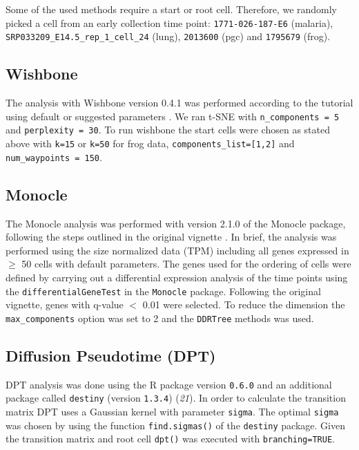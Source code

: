 Some of the used methods require a start or root cell. Therefore, we randomly picked a cell from an early collection time point: \texttt{1771-026-187-E6} (malaria), \texttt{SRP033209\_E14.5\_rep\_1\_cell\_24} (lung), \texttt{2013600} (pgc) and \texttt{1795679} (frog).

\subsection{Wishbone}

The analysis with Wishbone version 0.4.1 was performed according to the tutorial using default or suggested parameters \cite{Setty2016-ie}. We ran t-SNE with \texttt{n\_components = 5} and \texttt{perplexity = 30}. To run wishbone the start cells were chosen as  stated above with \texttt{k=15} or \texttt{k=50} for frog data, \texttt{components\_list=[1,2]} and \texttt{num\_waypoints = 150}.

\subsection{Monocle}

The Monocle analysis was performed with version 2.1.0 of the Monocle package, following the steps outlined in the original vignette \cite{Trapnell2014-cn}. In brief, the analysis was  performed using the size normalized data (TPM) including all genes expressed in $ \geq $ 50 cells with default parameters. The genes used for the ordering of cells were defined by carrying out a differential expression analysis of the time points using the \texttt{differentialGeneTest} in the \texttt{Monocle} package. Following the original vignette, genes with q-value $<$ 0.01 were selected. To reduce the dimension the \texttt{max\_components} option was set to 2 and the \texttt{DDRTree} methods was used.

\subsection{Diffusion Pseudotime (DPT)}

DPT analysis was done using the R package version \texttt{0.6.0} and an additional package called \texttt{destiny} (version \texttt{1.3.4}) ({\it 21}). In order to calculate the transition matrix DPT uses a Gaussian kernel with parameter \texttt{sigma}. The optimal \texttt{sigma} was chosen by  using the function \texttt{find.sigmas()} of the \texttt{destiny} package. Given the transition matrix and root cell \texttt{dpt()} was executed with \texttt{branching=TRUE}.

